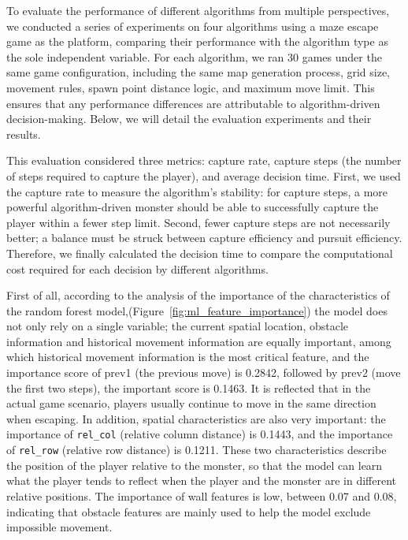 \documentclass[12pt,a4paper]{article}
\begin{document}
To evaluate the performance of different algorithms from multiple perspectives, we conducted a series of experiments on four algorithms using a maze escape game as the platform, comparing their performance with the algorithm type as the sole independent variable. For each algorithm, we ran 30 games under the same game configuration, including the same map generation process, grid size, movement rules, spawn point distance logic, and maximum move limit. This ensures that any performance differences are attributable to algorithm-driven decision-making. Below, we will detail the evaluation experiments and their results.

This evaluation considered three metrics: capture rate, capture steps (the number of steps required to capture the player), and average decision time. First, we used the capture rate to measure the algorithm's stability: for capture steps, a more powerful algorithm-driven monster should be able to successfully capture the player within a fewer step limit. Second, fewer capture steps are not necessarily better; a balance must be struck between capture efficiency and pursuit efficiency. Therefore, we finally calculated the decision time to compare the computational cost required for each decision by different algorithms.

First of all, according to the analysis of the importance of the characteristics of the random forest model,(Figure~\ref{fig:ml_feature_importance}) the model does not only rely on a single variable; the current spatial location, obstacle information and historical movement information are equally important, among which historical movement information is the most critical feature, and the importance score of prev1 (the previous move) is 0.2842, followed by prev2 (move the first two steps), the important score is 0.1463. It is reflected that in the actual game scenario, players usually continue to move in the same direction when escaping. In addition, spatial characteristics are also very important: the importance of \texttt{rel\_col} (relative column distance) is 0.1443, and the importance of \texttt{rel\_row} (relative row distance) is 0.1211. These two characteristics describe the position of the player relative to the monster, so that the model can learn what the player tends to reflect when the player and the monster are in different relative positions. The importance of wall features is low, between 0.07 and 0.08, indicating that obstacle features are mainly used to help the model exclude impossible movement.
\end{document}
